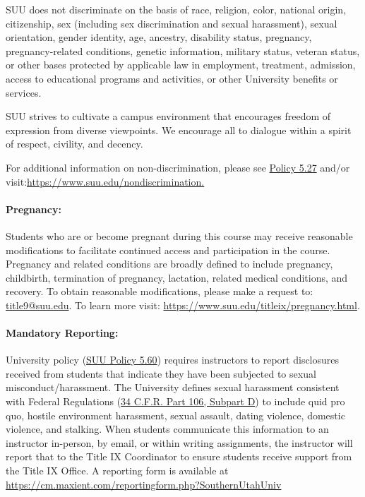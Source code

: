 \documentclass[12pt, letterpaper]{article}
\begin{document}
\noindent
SUU does not discriminate on the basis of race, religion, color, national origin, citizenship, sex (including sex discrimination and sexual harassment), sexual orientation, gender identity, age, ancestry, disability status, pregnancy, pregnancy-related conditions, genetic information, military status, veteran status, or other bases protected by applicable law in employment, treatment, admission, access to educational programs and activities, or other University benefits or services.

\noindent
SUU strives to cultivate a campus environment that encourages freedom of expression from diverse viewpoints. We encourage all to dialogue within a spirit of respect, civility, and decency.

\noindent
For additional information on non-discrimination, please see \href{https://www.suu.edu/policies/05/27.html}{Policy 5.27} and/or visit:\newline \href{https://www.suu.edu/nondiscrimination.}{https://www.suu.edu/nondiscrimination.}

\paragraph{Pregnancy:}
Students who are or become pregnant during this course may receive reasonable modifications to facilitate continued access and participation in the course. Pregnancy and related conditions are broadly defined to include pregnancy, childbirth, termination of pregnancy, lactation, related medical conditions, and recovery. To obtain reasonable modifications, please make a request to: \href{mailto:title9@suu.edu}{title9@suu.edu}. To learn more visit: \href{https://www.suu.edu/titleix/pregnancy.html}{https://www.suu.edu/titleix/pregnancy.html}.

\paragraph{Mandatory Reporting:}
University policy (\href{https://www.suu.edu/policies/05/60.html}{SUU Policy 5.60}) requires instructors to report disclosures received from students that indicate they have been subjected to sexual misconduct/harassment. The University defines sexual harassment consistent with Federal Regulations (\href{https://www.ecfr.gov/current/title-34/subtitle-B/chapter-I/part-106/subpart-D}{34 C.F.R. Part 106, Subpart D}) to include quid pro quo, hostile environment harassment, sexual assault, dating violence, domestic violence, and stalking. When students communicate this information to an instructor in-person, by email, or within writing assignments, the instructor will report that to the Title IX Coordinator to ensure students receive support from the Title IX Office. A reporting form is available at \href{https://cm.maxient.com/reportingform.php?SouthernUtahUniv}{https://cm.maxient.com/reportingform.php?SouthernUtahUniv}
\end{document}
